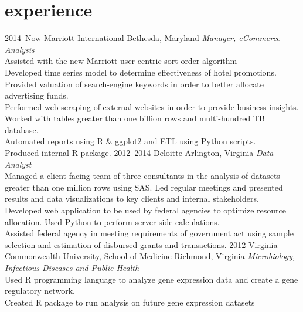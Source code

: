 \documentclass[]{friggeri-cv}
\begin{document}
\section{experience}

\begin{entrylist}
\entry
{2014--Now}
{Marriott International}
{Bethesda, Maryland}
{\emph{Manager, eCommerce Analysis} \\
Assisted with the new Marriott user-centric sort order algorithm \\
Developed time series model to determine effectiveness of hotel promotions. \\
Provided valuation of search-engine keywords in order to better allocate advertising funds. \\
Performed web scraping of external websites in order to provide business insights. \\
Worked with tables greater than one billion rows and multi-hundred TB database. \\
Automated reports using R \& ggplot2 and ETL using Python scripts. \\
Produced internal R package.
}
\entry
{2012--2014}
{Deloitte}
{Arlington, Virginia}
{\emph{Data Analyst} \\
Managed a client-facing team of three consultants in the analysis of datasets greater than one million rows using SAS. 
Led regular meetings and presented results and data visualizations to key clients and internal stakeholders. \\
Developed web application to be used by federal agencies to optimize resource allocation. 
Used Python to perform server-side calculations. \\
Assisted federal agency in meeting requirements of government act using sample selection and estimation of disbursed grants and transactions.
}
\entry
{2012}
{Virginia Commonwealth University, School of Medicine}
{Richmond, Virginia}
{\emph{Microbiology, Infectious Diseases and Public Health} \\
Used R programming language to analyze gene expression data and create a gene regulatory network. \\
Created R package to run analysis on future gene expression datasets}
\end{entrylist}

\end{document}
